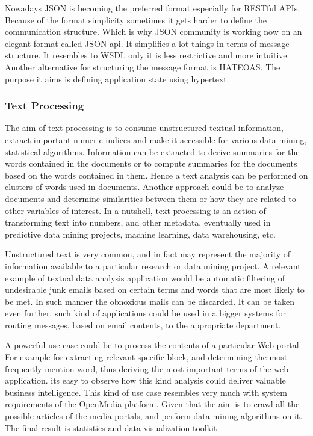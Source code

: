 Nowadays JSON is becoming the preferred format especially for RESTful APIs. Because of the format simplicity sometimes it gets harder to define the communication structure. Which is why JSON community is working now on an elegant format called JSON-api. It simplifies a lot things in terms of message structure. It resembles to WSDL only it is less restrictive and more intuitive. Another alternative for structuring the message format is HATEOAS. The purpose it aims is defining application state using hypertext.

\subsubsection{Text Processing}
The aim of text processing is to consume unstructured textual information, extract important numeric indices and make it accessible for various data mining, statistical algorithms. Information can be extracted to derive summaries for the words contained in the documents or to compute summaries for the documents based on the words contained in them. Hence a text analysis can be performed on clusters of words used in documents. Another approach could be to analyze documents and determine similarities between them or how they are related to other variables of interest. In a nutshell, text processing is an action of transforming text into numbers, and other metadata, eventually used in predictive data mining projects, machine learning, data warehousing, etc.

Unstructured text is very common, and in fact may represent the majority of information available to a particular research or data mining project. A relevant example of textual data analysis application would be automatic filtering of undesirable junk emails based on certain terms and words that are most likely to be met. In such manner the obnoxious mails can be discarded. It can be taken even further, such kind of applications could be used in a bigger systems for routing messages, based on email contents, to the appropriate department.

A powerful use case could be to process the contents of a particular Web portal. For example for extracting relevant specific block, and determining the most frequently mention word, thus deriving the most important terms of the web application. its easy to observe how this kind analysis could deliver valuable business intelligence. This kind of use case resembles very much with system requirements of the OpenMedia platform. Given that the aim is to crawl all the possible articles of the media portals, and perform data mining algorithms on it. The final result is statistics and data visualization toolkit


